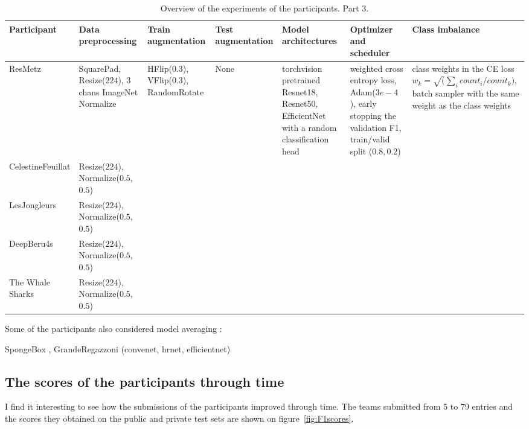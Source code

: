 \documentclass{article}
\begin{document}
{\begin{landscape}
		\begin{table}
			\begin{tabular}{p{3cm}|p{3cm}|p{3cm}|p{3cm}|p{3cm}|p{3cm}|p{3cm}}
			Participant & Data preprocessing & Train augmentation & Test augmentation & Model architectures & Optimizer and scheduler & Class imbalance \\
			\hline
			ResMetz & 
			SquarePad, Resize($224$), 3 chans ImageNet Normalize & 
				HFlip($0.3$), VFlip($0.3$), RandomRotate
			& None
			& torchvision pretrained Resnet18, Resnet50, EfficientNet with a random classification head
				& weighted cross entropy loss, Adam($3e-4$), early stopping the validation F1, train/valid split ($0.8, 0.2$)
			&
			class weights in the CE loss $w_k=\sqrt(\sum_i count_i/count_k)$, batch sampler with the same weight as the class weights

			\\
			\hline
			CelestineFeuillat & 
			Resize($224$), Normalize($0.5$, $0.5$) & 
			&
			&
			&
			&
			\\
			\hline
			LesJongleurs & 
			Resize($224$), Normalize($0.5$, $0.5$) & 
			&
			&
			&
			&
			\\
			\hline
			DeepBeru4s & 
			Resize($224$), Normalize($0.5$, $0.5$) & 
			&
			&
			&
			&
			\\
			\hline
			The Whale Sharks & 
			Resize($224$), Normalize($0.5$, $0.5$) & 
			&
			&
			&
			&
			\\
		\end{tabular}
			\caption{Overview of the experiments of the participants. Part 3. \label{table:overview3}}
	\end{table}
	\end{landscape}
	\clearpage
}

Some of the participants also considered model averaging :

SpongeBox , GrandeRegazzoni (convenet, hrnet, efficientnet)


\subsection{The scores of the participants through time}

I find it interesting to see how the submissions of the participants improved through time. The teams submitted from 5 to 79 entries and the scores they obtained on the public and private test sets are shown on figure~\ref{fig:F1scores}.
\end{document}
